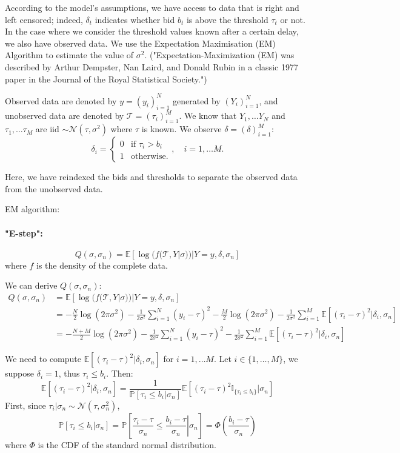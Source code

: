 \documentclass[11pt]{article}
\begin{document}
According to the model's assumptions, 
we have access to data that is right and left censored; indeed, $\delta_t$ indicates whether bid $b_t$ is above the threshold $\tau_t$ or not. In the case 
where we consider the threshold values known after a certain delay, we also have observed data. 
We use the Expectation Maximisation (EM) Algorithm to estimate the value of $\sigma^2$.
("Expectation-Maximization (EM) was described by Arthur Dempster, Nan Laird, and Donald Rubin in a classic 1977 paper in the Journal of the Royal Statistical Society.")

Observed data are denoted by $y = (y_i)_{i = 1}^N$ generated by $(Y_i)_{i = 1}^N$, and unobserved data are denoted by $\mathcal{T} = (\tau_i)_{i=1}^M$. We know that $Y_1, \dots Y_N$ and $\tau_1, \dots \tau_M$ are iid
$\sim \mathcal{N}(\tau, \sigma^2)$ where $\tau$ is known. We observe $\delta = (\delta)_{i=1}^M$:
$$
\delta_i= \left\{
    \begin{array}{ll}
        0 & \mbox{if } \tau_i > b_i \\
        1 & \mbox{otherwise.}
    \end{array}
\right., \quad i = 1, \dots M.
$$

Here, we have reindexed the bids and thresholds to separate the observed data from the unobserved data.

EM algorithm:
\paragraph*{"E-step":}
$$Q(\sigma, \sigma_n) = \mathbb{E}\left[\log(f(\mathcal{T},Y|\sigma))|Y = y, \delta, \sigma_n\right]$$
where $f$ is the density of the complete data.

We can derive $Q(\sigma, \sigma_n)$:
\begin{align*}
  Q(\sigma, \sigma_n) &= \mathbb{E}\left[\log(f(\mathcal{T},Y|\sigma))|Y = y, \delta, \sigma_n\right] \\
  &= - \frac{N}{2} \log(2 \pi \sigma^2) - \frac{1}{2\sigma^2} \sum_{i = 1}^N (y_i - \tau)^2 - \frac{M}{2}\log(2 \pi \sigma^2)  - \frac{1}{2\sigma^2} \sum_{i = 1}^M \mathbb{E}\left[(\tau_i - \tau)^2| \delta_i, \sigma_n\right]\\
  &= - \frac{N + M}{2} \log(2 \pi \sigma^2) - \frac{1}{2\sigma^2} \sum_{i = 1}^N (y_i - \tau)^2 - \frac{1}{2\sigma^2} \sum_{i = 1}^M \mathbb{E}\left[(\tau_i - \tau)^2| \delta_i, \sigma_n\right]
\end{align*}

We need to compute $\mathbb{E}\left[(\tau_i - \tau)^2| \delta_i, \sigma_n\right]$ for $i = 1, \dots M$. Let $i \in \{1, \dots,  M\}$, we suppose $\delta_i = 1$, thus $\tau_i \leq b_i$. Then:
\[
\mathbb{E}\left[(\tau_i - \tau)^2| \delta_i, \sigma_n\right] = \frac{1}{\mathbb{P}[\tau_i \leq b_i | \sigma_n]}\mathbb{E}\left[ (\tau_i - \tau)^2 \mathbb{I}_{\{\tau_i \leq b_i\}}|\sigma_n\right]
\]
First, since $\tau_i | \sigma_n \sim \mathcal{N}(\tau, \sigma_n^2)$,
$$ \mathbb{P}[\tau_i \leq b_i | \sigma_n] = \mathbb{P}\left[\left.\frac{\tau_i - \tau}{\sigma_n} \leq \frac{b_i - \tau}{\sigma_n} \right| \sigma_n\right] = \Phi\left(\frac{b_i - \tau}{\sigma_n}\right)$$
where $\Phi$ is the CDF of the standard normal distribution.
\end{document}
